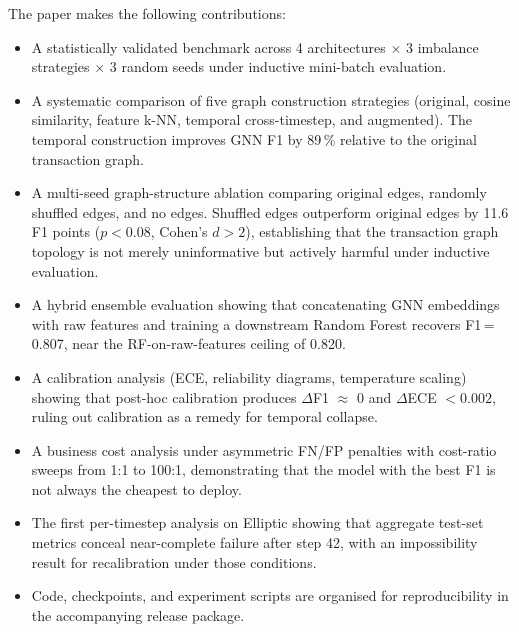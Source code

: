 The paper makes the following contributions:

\begin{itemize}[leftmargin=*]
  \item A statistically validated benchmark across 4 architectures
    $\times$ 3 imbalance strategies $\times$ 3 random seeds under
    inductive mini-batch evaluation.

  \item A systematic comparison of five graph construction strategies
    (original, cosine similarity, feature k-NN, temporal
    cross-timestep, and augmented).  The temporal construction improves
    GNN F1 by 89\,\% relative to the original transaction graph.

  \item A multi-seed graph-structure ablation comparing original edges,
    randomly shuffled edges, and no edges.  Shuffled edges outperform
    original edges by 11.6 F1 points ($p < 0.08$, Cohen's $d > 2$),
    establishing that the transaction graph topology is not merely
    uninformative but actively harmful under inductive evaluation.

  \item A hybrid ensemble evaluation showing that concatenating GNN
    embeddings with raw features and training a downstream Random
    Forest recovers F1\,=\,0.807, near the RF-on-raw-features ceiling
    of 0.820.

  \item A calibration analysis (ECE, reliability diagrams, temperature
    scaling) showing that post-hoc calibration produces $\Delta$F1
    $\approx$ 0 and $\Delta$ECE $< 0.002$, ruling out calibration as
    a remedy for temporal collapse.

  \item A business cost analysis under asymmetric FN/FP penalties with
    cost-ratio sweeps from 1:1 to 100:1, demonstrating that the model
    with the best F1 is not always the cheapest to deploy.

  \item The first per-timestep analysis on Elliptic showing that
    aggregate test-set metrics conceal near-complete failure after
    step 42, with an impossibility result for recalibration under those
    conditions.

  \item Code, checkpoints, and experiment scripts are organised for
    reproducibility in the accompanying release package.
\end{itemize}


